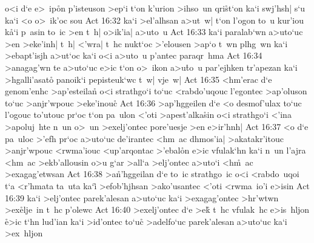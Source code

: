 o<i
d`e
e>~ip\r{o}n
p'isteuson
>ep`i
t`on
k'urion
>ihso~un
qri\r{s}t`on
ka`i
swj'hsh|
s`u
ka`i
<o
o>~ik'oc
sou\bibvsend
\vs Act 16:32
ka`i
>el'alhsan
a>ut~w|
t`on
l'ogon
to~u
kur'iou
k\r{a}`i
p~asin
to~ic
>en
t~h|
o>ik'ia|
a>uto~u\bibvsend
\vs Act 16:33
ka`i
paralab`wn
a>uto`uc
>en
>eke'inh|
t~h|
<'wra|
t~hc
nukt`oc
>'elousen
>ap`o
t~wn
plhg~wn
ka`i
>ebapt'isjh
a>ut`oc
ka`i
o<i
a>uto~u
p'antec
paraqr~hma\bibvsend
\vs Act 16:34
>anagag'wn
te
a>uto`uc
e>ic
t`on
o>~ikon
a>u\r{t}o~u
par'ejhken
tr'apezan
ka`i
>hgalli'asato\r{}
panoik`i
pepisteuk`wc
t~w|
vje~w|\bibvsend
\vs Act 16:35
<hm'erac
d`e
genom'enhc
>ap'esteilan\r{}
o<i
strathgo`i
to`uc
<rabdo'uqouc
l'egontec
>ap'oluson
to`uc
>anjr'wpouc
>eke'inou\r{c}\bibvsend
{}
\vs Act 16:36
>ap'hggeilen
d`e
<o
desmof'ulax
to`uc
l'ogouc
to'utouc
pr`oc
t`on
pa~ulon
<'oti
>apest'alka\r{s}in
o<i
strathgo`i
<'ina
>apoluj~hte
n~un
o>~un
>exelj'ontec
pore'uesje
>en
e>ir'hnh|\bibvsend
\vs Act 16:37
<o
d`e
pa~uloc
>'efh
pr`oc
a>uto`uc
de'irantec
<hm~ac
dhmos'ia|
>akatakr'itouc
>anjr'wpouc
<rwma'iouc
<up'arqontac
>'ebal\r{o}n
e>ic
vfulak`hn
ka`i
n~un
l'ajra
<hm~ac
>ekb'allousin
o>u
g`ar
>all`a
>elj'ontec
a>uto`i
<h\r{m}~ac
>exagag'etwsan\bibvsend
\vs Act 16:38
>a\r{n}'hggeilan
d`e
to~ic
strathgo~ic
o<i
<rabdo~uqoi
t`a
<r'hmata
ta~uta
ka`i\r{}
>efob'hjhsan
>ako'usantec
<'oti
<rwma~io'i
e>isin\bibvsend
\vs Act 16:39
ka`i
>elj'ontec
parek'alesan
a>uto`uc
ka`i
>exagag'ontec
>hr'wtwn
>ex\r{e}lje~in
t~hc
p'olewc\bibvsend
\vs Act 16:40
>exelj'ontec
d`e
>e\r{k}
t~hc
vfulak~hc
e>is~hljon
\r{e}>ic
t`hn
lud'ian
ka`i
>id'ontec
to`uc\r{}
>adelfo`uc
parek'alesan
a>uto`uc
ka`i
>ex~hljon\bibvsend
